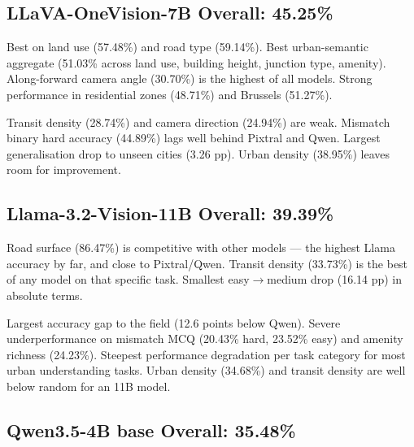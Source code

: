 \documentclass[11pt,a4paper]{article}
\begin{document}
\subsection{LLaVA-OneVision-7B \hfill{\normalfont\small Overall: 45.25\%}}

\begin{infobox}[Strengths]
Best on land use (57.48\%) and road type (59.14\%). Best urban-semantic
aggregate (51.03\% across land use, building height, junction type, amenity).
Along-forward camera angle (30.70\%) is the highest of all models. Strong
performance in residential zones (48.71\%) and Brussels (51.27\%).
\end{infobox}

\begin{warnbox}[Weaknesses]
Transit density (28.74\%) and camera direction (24.94\%) are weak.
Mismatch binary hard accuracy (44.89\%) lags well behind Pixtral and Qwen.
Largest generalisation drop to unseen cities (3.26 pp). Urban density
(38.95\%) leaves room for improvement.
\end{warnbox}

\subsection{Llama-3.2-Vision-11B \hfill{\normalfont\small Overall: 39.39\%}}

\begin{infobox}[Strengths]
Road surface (86.47\%) is competitive with other models — the highest
Llama accuracy by far, and close to Pixtral/Qwen. Transit density (33.73\%)
is the best of any model on that specific task. Smallest easy$\to$medium
drop (16.14 pp) in absolute terms.
\end{infobox}

\begin{warnbox}[Weaknesses]
Largest accuracy gap to the field (12.6 points below Qwen). Severe
underperformance on mismatch MCQ (20.43\% hard, 23.52\% easy) and amenity
richness (24.23\%). Steepest performance degradation per task category for
most urban understanding tasks. Urban density (34.68\%) and transit density
are well below random for an 11B model.
\end{warnbox}


\subsection{Qwen3.5-4B base \hfill{\normalfont\small Overall: 35.48\%}}
\end{document}
